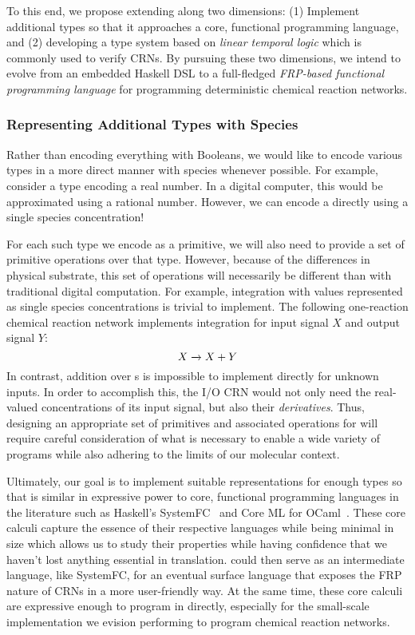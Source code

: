 To this end, we propose extending \reactamole{} along two dimensions:
(1) Implement additional types so that it approaches a core, functional programming language, and
(2) developing a type system based on \emph{linear temporal logic} which is commonly used to verify CRNs.
By pursuing these two dimensions, we intend to evolve \reactamole from an embedded Haskell DSL to a full-fledged \emph{FRP-based functional programming language} for programming deterministic chemical reaction networks.

\subsubsection{Representing Additional Types with Species}
Rather than encoding everything with Booleans, we would like to encode various types in a more direct manner with species whenever possible.
For example, consider a  type encoding a real number.
In a digital computer, this would be approximated using a rational number.
However, we can encode a  directly using a single species concentration!

For each such type we encode as a primitive, we will also need to provide a set of primitive operations over that type.
However, because of the differences in physical substrate, this set of operations will necessarily be different than with traditional digital computation.
For example, integration with  values represented as single species concentrations is trivial to implement.
The following one-reaction chemical reaction network implements integration for input signal \( X \) and output signal \( Y \):
\[
  X \xrightarrow{} X + Y
\]
In contrast, addition over s is impossible to implement directly for unknown inputs.
In order to accomplish this, the I/O CRN would not only need the real-valued concentrations of its input signal, but also their \emph{derivatives}.
Thus, designing an appropriate set of primitives and associated operations for \reactamole{} will require careful consideration of what is necessary to enable a wide variety of programs while also adhering to the limits of our molecular context.

Ultimately, our goal is to implement suitable representations for enough types so that \reactamole is similar in expressive power to core, functional programming languages in the literature such as Haskell's SystemFC~\cite{weirich:2013:fc} and Core ML for OCaml~\cite{remy:2001:ocaml}.
These core calculi capture the essence of their respective languages while being minimal in size which allows us to study their properties while having confidence that we haven't lost anything essential in translation.
\reactamole could then serve as an intermediate language, like SystemFC, for an eventual surface language that exposes the FRP nature of CRNs in a more user-friendly way.
At the same time, these core calculi are expressive enough to program in directly, especially for the small-scale implementation we evision performing to program chemical reaction networks.

